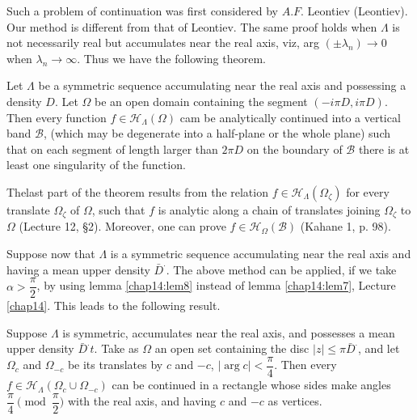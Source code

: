 Such a problem of continuation was first considered by $A.F$. Leontiev
(Leontiev). Our method is different from that of Leontiev. The same
proof holds when $\Lambda$ is not necessarily real but accumulates
near the real axis, viz, arg $(\pm \lambda_n ) \to 0$ when $\lambda_n
\to \infty$. Thus we have the following theorem. 

\begin{theorem*}
 Let $\Lambda$ be a symmetric sequence accumulating near the real
 axis and possessing a density $D$. Let $\Omega$ be an open domain
 containing the segment $( - i \pi D, i \pi D) $. Then every function
 $f \in \mathscr{H}_\Lambda (\Omega)$ cam be analytically continued
 into a vertical band $\mathscr{B}$, (which may be degenerate into a
 half-plane or the whole plane) such that on each segment of length
 larger than $2 \pi D$ on the boundary of $\mathscr{B}$ there is at
 least one singularity of the function. 
\end{theorem*}

The\pageoriginale last part of the theorem results from the relation $f \in
\mathscr{H}_\Lambda (\Omega_\zeta)$ for every translate $\Omega_\zeta
$ of $\Omega$, such that $f$ is analytic along a chain of translates
joining $\Omega_\zeta$ to $\Omega$ (Lecture 12, \S 2). Moreover,
one can prove $f \in \mathscr{H}_\Omega (\mathscr{B})$ (Kahane 1, p. 98). 

Suppose now that $\Lambda$ is a symmetric sequence accumulating near
the real axis and having a mean upper density $\bar{D}^.$. The above
method can be applied, if we take $\alpha > \dfrac{\pi}{2}$, by using
lemma \ref{chap14:lem8} instead of lemma \ref{chap14:lem7}, Lecture
\ref{chap14}. This leads to the
following result. 

\begin{theorem*} %
 Suppose $\Lambda$ is symmetric, accumulates near the real axis, and
 possesses a mean upper density $\bar{D}^.t$. Take as $\Omega$ an
 open set containing the disc $| z | \le \pi \bar{D}^.$, and let
 $\Omega_c$ and $\Omega_{-c}$ be its translates by $c$ and $-c$,
 $\big | \arg c \big | < \dfrac{\pi}{4}$. Then every $f \in
 \mathscr{H}_\Lambda (\Omega_c \cup \Omega_{-c})$ can be continued
 in a rectangle whose sides make angles $\dfrac{\pi}{4}
 \pmod{\dfrac{\pi}{2}}$ with the real axis, and having $c$ and $-c$ as
 vertices. 
\end{theorem*}

